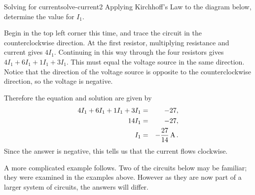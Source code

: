 \begin{example}{Solving for current}{solve-current2}
  Applying Kirchhoff's Law to the diagram below, determine the value for $I_1$.

  \begin{center}
  \end{center}

\end{example}

\begin{solution}
  Begin in the top left corner this time, and trace the circuit in the
  counterclockwise direction. At the first resistor, multiplying
  resistance and current gives $4I_1$. Continuing in this way through
  the four resistors gives $4I_1 + 6I_1 + 1 I_1 + 3I_1$. This must
  equal the voltage source in the same direction. Notice that the
  direction of the voltage source is opposite to the counterclockwise
  direction, so the voltage is negative.

  Therefore the equation and solution are given by
  \begin{eqnarray*}
    4I_1 + 6I_1 + 1 I_1 + 3I_1&=& -27, \\
    14I_1 &=& -27, \\
    I_1 &=& -\frac{27}{14} \mathop{\textrm{\rm A}}\nolimits.
  \end{eqnarray*}
  Since the answer is negative, this tells us that the current flows
  clockwise.
\end{solution}

A more complicated example follows. Two of the circuits below may be
familiar; they were examined in the examples above. However as they
are now part of a larger system of circuits, the answers will differ.

